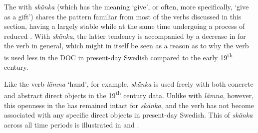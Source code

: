\documentclass[output=paper]{langscibook}
\begin{document}
\label{sec:valdeson:5.3.3.7}\largerpage
The  with \textit{skänka} (which has the meaning ‘give’, or often, more specifically, ‘give as a gift’) shares the pattern familiar from most of the verbs discussed in this section, having a largely stable  while at the same time undergoing a process of reduced . With \textit{skänka}, the latter tendency is accompanied by a decrease in  for the verb in general, which might in itself be seen as a reason as to why the verb is used less in the DOC in present-day Swedish compared to the early 19\textsuperscript{th} century.


\begin{table}
\caption{Frequency measures of the verb{}-specific DOC with \textit{skänka} ‘give’}
\label{tab:valdeson:20}
\end{table}

Like the verb \textit{lämna} ‘hand’, for example, \textit{skänka} is used freely with both concrete and abstract direct objects in the 19\textsuperscript{th} century data. Unlike with \textit{lämna}, however, this openness in the  has remained intact for \textit{skänka}, and the verb has not become associated with any specific direct objects in present-day Swedish. This  of \textit{skänka} across all time periods is illustrated in  and .
\end{document}
